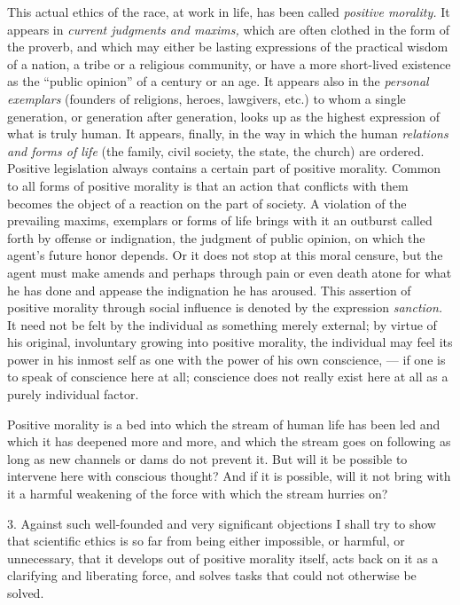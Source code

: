 \documentclass[12pt,a4paper,openany]{book}
\newcommand{\opage}[1]{\marginnote{\footnotesize\textit{[#1]}}}
\begin{document}
This actual ethics of the race, at work in life, has been called \textit{positive morality.} It
appears in \textit{current judgments and maxims,} which are often clothed in the form of the proverb,
and which may either be lasting expressions of the practical wisdom of a nation, a tribe or a
religious community, or have a more short-lived existence as the ``public opinion'' of a century or
an age. It appears also in the \textit{personal exemplars} (founders of religions, heroes,
lawgivers, etc.) to whom a single generation, or generation after generation, looks up as the
highest expression of what is truly human. It appears, finally, in the way in which the human
\textit{relations and forms of life} (the family, civil society, the state, the church) are ordered.
Positive legislation always contains a certain part of positive morality. Common to all forms of
positive morality is that an action that conflicts with them becomes the object of a reaction on
the part of society. A violation of the prevailing maxims, exemplars or forms of life brings with it
an outburst called forth by offense or indignation, the judgment of public opinion, on which the
agent's future honor depends. Or it does not stop at this moral censure, but the agent must make
amends and perhaps through pain or even death atone for what he has done and appease the
indignation he has aroused. This assertion of positive morality through social influence is
denoted by the expression \textit{sanction.} It need not be felt by the individual as something
merely external; by virtue of his original, involuntary growing into positive morality, the
individual may feel its power in his inmost self as one with the power of his own conscience, ---
if one is to speak of conscience
\opage{7}here at all; conscience does not really exist here at all as a purely individual factor.

Positive morality is a bed into which the stream of human life has been led and which it has
deepened more and more, and which the stream goes on following as long as new channels or dams do
not prevent it. But will it be possible to intervene here with conscious thought? And if it is
possible, will it not bring with it a harmful weakening of the force with which the stream hurries
on?

3. Against such well-founded and very significant objections I shall try to show that scientific
ethics is so far from being either impossible, or harmful, or unnecessary, that it develops out of
positive morality itself, acts back on it as a clarifying and liberating force, and solves tasks
that could not otherwise be solved.
\end{document}
